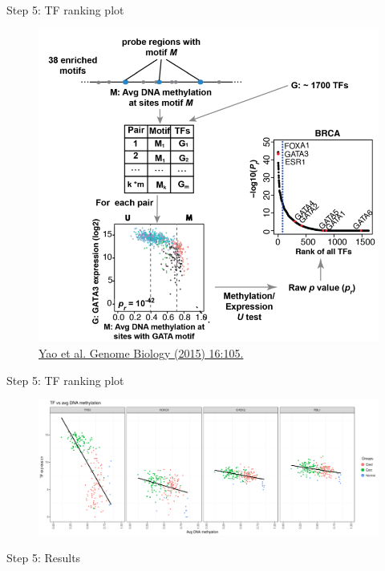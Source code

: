 \documentclass[slidestop,compress,11pt,xcolor=dvipsnames]{beamer}
\begin{document}
\begin{frame}{Step 5: TF ranking plot}
 \vspace*{-0.5cm}
 \begin{figure}
  \centering
  \includegraphics[width=0.7\linewidth]{ELMER/tfrank.png}{\tiny{\\\href{https://genomebiology.biomedcentral.com/articles/10.1186/s13059-015-0668-3}{Yao et al. Genome Biology (2015) 16:105.}}}
 \end{figure}
\end{frame}

\begin{frame}{Step 5: TF ranking plot}
 \begin{figure}
  \centering
  \includegraphics[width=1.0\linewidth]{ELMER/TF_plot_scatter.png}
 \end{figure}
\end{frame}

\begin{frame}{Step 5: Results}
 \begin{table}[h!]
  \centering
  \tiny
  \label{tab:get.tf}
 \end{table}
\end{frame}
\end{document}
